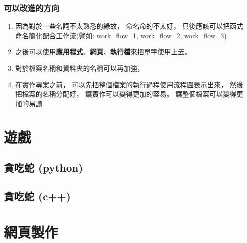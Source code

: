 \documentclass[12pt]{ctexart}
\begin{document}
\subsubsection{ 可以改進的方向}
\begin{enumerate}
    \item 
        因為對於一些名詞不太熟悉的緣故，
        命名命的不太好，
        只後應該可以把函式命名簡化配合工作流(譬如: work\_flow\_1, work\_flow\_2, work\_flow\_3)
    \item
        之後可以使用\textbf{應用程式}、\textbf{網頁}、\textbf{執行檔}來把單字使用上去。
    \item
        對於檔案名稱和資料夾的名稱可以再加強，
    \item 
        在實作專案之前，
        可以先把整個檔案的執行過程使用流程圖表示出來，
        然後把檔案的名稱分配好，
        讓實作可以變得更加的容易。
        讓整個檔案可以變得更加的易讀
\end{enumerate}


\clearpage
\section{ 遊戲}
\label{sec::game}
\subsection{ 貪吃蛇 (python) }
\clearpage
\subsection{ 貪吃蛇 (c++) }

\clearpage
\section{ 網頁製作 }
\label{ sec::website }
\end{document}
